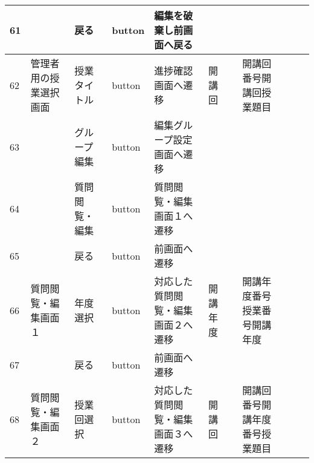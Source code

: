 \begin{landscape}
\begin{table}[]
\begin{tabular}{|l|l|l|l|l|l|l|l|l|l|l|}
61  &               & 戻る               & button   & 編集を破棄し前画面へ戻る                                                      &         &                       &                    &                 &                               &                                                                \\ \hline
62  & 管理者用の授業選択画面   & 授業タイトル           & button   & 進捗確認画面へ遷移                                                         & 開講回     &                       & 開講回番号開講回授業題目       &                 &                               &                                                                \\ \hline
63  &               & グループ編集           & button   & 編集グループ設定画面へ遷移                                                     &         &                       &                    &                 &                               &                                                                \\ \hline
64  &               & 質問閲覧・編集          & button   & 質問閲覧・編集画面１へ遷移                                                     &         &                       &                    &                 &                               &                                                                \\ \hline
65  &               & 戻る               & button   & 前画面へ遷移                                                            &         &                       &                    &                 &                               &                                                                \\ \hline
66  & 質問閲覧・編集画面１    & 年度選択             & button   & 対応した質問閲覧・編集画面２へ遷移                                                 & 開講年度    &                       & 開講年度番号授業番号開講年度     &                 &                               &                                                                \\ \hline
67  &               & 戻る               & button   & 前画面へ遷移                                                            &         &                       &                    &                 &                               &                                                                \\ \hline
68  & 質問閲覧・編集画面２    & 授業回選択            & button   & 対応した質問閲覧・編集画面３へ遷移                                                 & 開講回     &                       & 開講回番号開講年度番号授業題目    &                 &                               &                                                                \\ \hline

\end{tabular}
\end{table}
\end{landscape}
